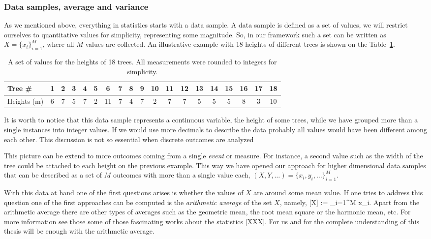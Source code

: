 \subsubsection{Data samples, average and variance}

As we mentioned above, everything in statistics starts with a data sample.
A data sample is defined as a set of values, we will restrict ourselves to quantitative values for simplicity, representing some magnitude.
So, in our framework such a set can be written as $X=\{x_i\}_{i=1}^M$, where all $M$ values are collected.
An illustrative example with 18 heights of different trees is shown on the Table~\ref{tab:bg-18-trees}.
\begin{table}
  \begin{center}
    \begin{tabular}{| l | c | c | c | c | c | c | c | c | c | c | c | c | c | c | c | c | c | c | }
      \hline
      Tree \# & 1 & 2 & 3 & 4 & 5 & 6 & 7 & 8 & 9 & 10 &  11 &  12 &  13 &  14 &  15 &  16 &  17 &  18
      \\ \hline
      Heights (m) & 6 &  7 &  5 &  7 &  2 & 11 &  7 &  4 &  7 &  2 &  7 &  7 &  5 &  5 &  5 &  8 &  3 & 10 \\ \hline
    \end{tabular}
  \end{center}
  \caption{A set of values for the heights of 18 trees. All measurements were rounded to integers for simplicity.}
  \label{tab:bg-18-trees}
\end{table}
It is worth to notice that this data sample represents a continuous variable, the height of some trees, while we have grouped more than a single instances into integer values.
If we would use more decimals to describe the data probably all values would have been different among each other.
This discussion is not so essential when discrete outcomes are analyzed

This picture can be extend to more outcomes coming from a single \emph{event} or measure.
For instance, a second value such as the width of the tree could be attached to each height on the previous example.
This way we have opened our approach for higher dimensional data samples that can be described as a set of $M$ outcomes with more than a single value each, $(X,Y,\dots)=\{x_i,y_i,\dots\}_{i=1}^M$.


With this data at hand one of the first questions arises is whether the values of $X$ are around some mean value.
If one tries to address this question one of the first approaches can be computed is the \emph{arithmetic average} of the set $X$, namely,
\be
  [X] := \sum_{i=1}^M x_i.
\ee
Apart from the arithmetic average there are other types of averages such as the geometric mean, the root mean square or the harmonic mean, etc.
For more information see those some of those fascinating works about the statistics [XXX].
For us and for the complete understanding of this thesis will be enough with the arithmetic average.

